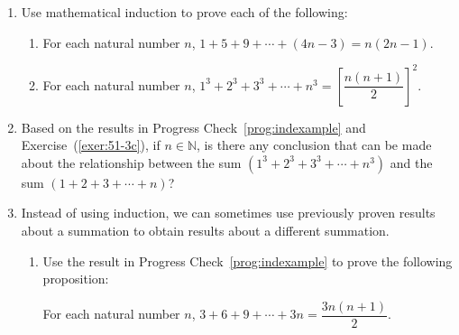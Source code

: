 \begin{enumerate}


\item Use mathematical induction to prove each of the following: \label{exer:sec51-3}

\begin{enumerate}

\yitem For each natural number  $n$,  
$2 + 5 + 8 +  \cdots  + \left( {3n - 1} \right) = \dfrac{{n\left( {3n + 1} \right)}}{2}$. 
\label{exer:inductionsum-a} 
\item For each natural number $n$, 
$1 + 5 + 9 + \cdots + \left(4n - 3 \right) = n \left(2n - 1 \right)$.

\item For each natural number  $n$, 
$1^3 + 2^3 + 3^3 + \cdots + n^3 =  \left[ {\dfrac{{n\left( {n + 1} \right)}}{2}} \right]^2$.
\label{exer:51-3c}
\end{enumerate}

\item  Based on the results in Progress Check~\ref{prog:indexample} and 
Exercise~(\ref{exer:51-3c}), if  $n \in \mathbb{N}$, is there any conclusion that can be made about the relationship between the sum $\left( {1^3  + 2^3  + 3^3  +  \cdots  + n^3 } \right)$
 and the sum $\left( {1 + 2 + 3 +  \cdots  + n} \right)$?
 

\item Instead of using induction, we can sometimes use previously proven results about a summation to obtain results about a different summation. \label{exer:previnduction}
\begin{enumerate} 
\item Use the result in Progress Check~\ref{prog:indexample} to prove the following proposition:
\begin{center}
For each natural number  $n$,  $3 + 6 + 9 +  \cdots  + 3n = \dfrac{{3n\left( {n + 1} \right)}}{2}$.
\end{center}
\label{exer:previnduction-a}


\end{enumerate}
\end{enumerate}

